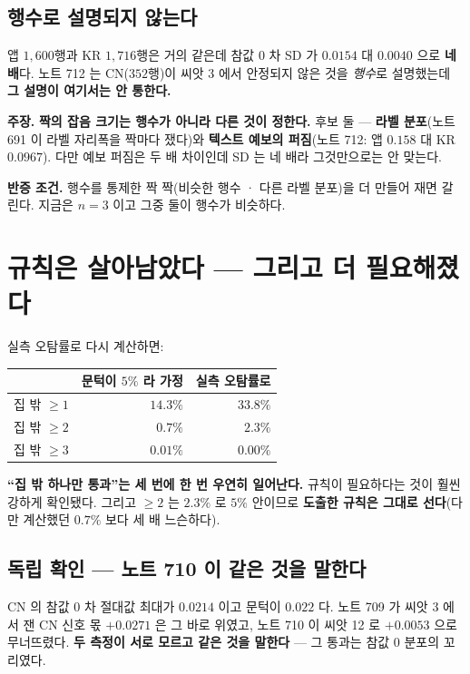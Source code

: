 \documentclass[10pt,a4paper]{article}
\newcommand{\claim}[2]{\begin{claimbox}\textbf{주장.} #1\par\smallskip
  \textcolor{gray!70}{\textbf{반증 조건.} #2}\end{claimbox}}
\begin{document}
\subsection*{행수로 설명되지 않는다}

앱 $1{,}600$행과 KR $1{,}716$행은 거의 같은데 참값 $0$ 차 SD 가 $0.0154$ 대
$0.0040$ 으로 \textbf{네 배}다. 노트 712 는 CN($352$행)이 씨앗 3 에서 안정되지
않은 것을 \emph{행수}로 설명했는데 \textbf{그 설명이 여기서는 안 통한다.}

\claim{\textbf{짝의 잡음 크기는 행수가 아니라 다른 것이 정한다.} 후보 둘 ---
\textbf{라벨 분포}(노트 691 이 라벨 자리폭을 짝마다 쟀다)와 \textbf{텍스트 예보의
퍼짐}(노트 712: 앱 $0.158$ 대 KR $0.0967$). 다만 예보 퍼짐은 두 배 차이인데 SD 는
네 배라 그것만으로는 안 맞는다.}
{행수를 통제한 짝 짝(비슷한 행수 · 다른 라벨 분포)을 더 만들어 재면 갈린다.
지금은 $n=3$ 이고 그중 둘이 행수가 비슷하다.}

\section{규칙은 살아남았다 --- 그리고 더 필요해졌다}

실측 오탐률로 다시 계산하면:

\begin{center}
\begin{tabular}{lrr}
\toprule
 & 문턱이 $5\%$ 라 가정 & \textbf{실측 오탐률로} \\
\midrule
집 밖 $\ge 1$ & $14.3\%$ & $\mathbf{33.8\%}$ \\
집 밖 $\ge 2$ & $0.7\%$ & $\mathbf{2.3\%}$ \\
집 밖 $\ge 3$ & $0.01\%$ & $0.00\%$ \\
\bottomrule
\end{tabular}
\end{center}

\textbf{``집 밖 하나만 통과''는 세 번에 한 번 우연히 일어난다.} 규칙이 필요하다는
것이 훨씬 강하게 확인됐다. 그리고 $\ge 2$ 는 $2.3\%$ 로 $5\%$ 안이므로
\textbf{도출한 규칙은 그대로 선다}(다만 계산했던 $0.7\%$ 보다 세 배 느슨하다).

\subsection*{독립 확인 --- 노트 710 이 같은 것을 말한다}

CN 의 참값 $0$ 차 절대값 최대가 $\mathbf{0.0214}$ 이고 문턱이 $0.022$ 다. 노트 709
가 씨앗 3 에서 잰 CN 신호 몫 $\mathbf{+0.0271}$ 은 그 바로 위였고, 노트 710 이 씨앗
12 로 $\mathbf{+0.0053}$ 으로 무너뜨렸다. \textbf{두 측정이 서로 모르고 같은 것을
말한다} --- 그 통과는 참값 $0$ 분포의 꼬리였다.
\end{document}
